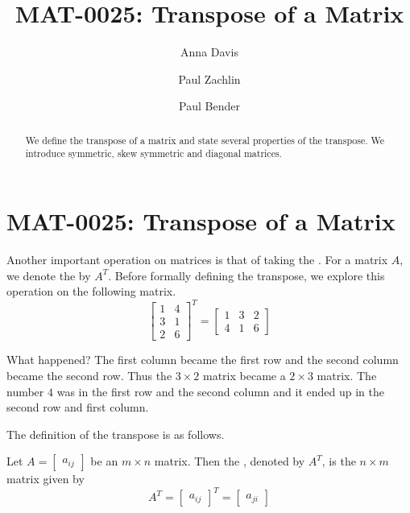 \documentclass{ximera}
\author{Anna Davis \and Paul Zachlin \and Paul Bender} \title{MAT-0025:  Transpose of a Matrix} \license{CC-BY 4.0}
\begin{document}
\begin{abstract}
  We define the transpose of a matrix and state several properties of the transpose.  We introduce symmetric, skew symmetric and diagonal matrices.
\end{abstract}
\maketitle



\section*{MAT-0025:  Transpose of a Matrix}



Another important operation on matrices is that of taking the . For a matrix $A$, we denote the
 by $A^T$. Before formally defining the transpose, we explore this
operation on the following matrix.
\begin{equation*}
\begin{bmatrix}
1 & 4 \\
3 & 1 \\
2 & 6
\end{bmatrix}^{T}=
\begin{bmatrix}
1 & 3 & 2 \\
4 & 1 & 6
\end{bmatrix}
\end{equation*}

What happened? The first column became the first row and the second column
became the second row. Thus the $3\times 2$ matrix became a $2\times 3$
matrix. The number $4$ was in the first row and the second column and it
ended up in the second row and first column. 

The definition of the transpose is as follows.

\begin{definition}\label{def:matrixtranspose}
Let $A=\begin{bmatrix} a _{ij}\end{bmatrix}$ be an $m\times n$ matrix. Then the , denoted by $A^{T}$, is the $n\times m$
matrix given by 
\begin{equation*}
A^{T} = \begin{bmatrix} a _{ij}\end{bmatrix}^{T}= \begin{bmatrix} a_{ji} \end{bmatrix}
\end{equation*}
\end{definition}
\end{document}
